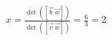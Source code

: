 \documentclass[preview]{standalone}
\begin{document}
\begin{align*}
x=\frac{\det([\vec{b}\ \vec{w}])}{\det([\vec{v}\ \vec{w}])}=\frac{6}{3}=2
\end{align*}
\end{document}
